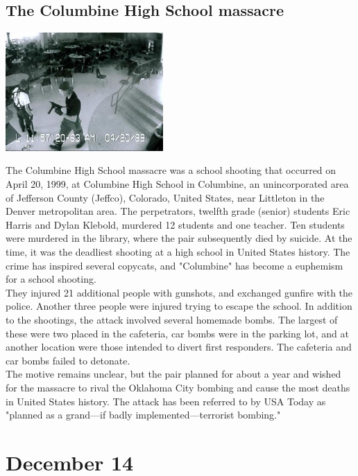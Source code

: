 \documentclass[11pt]{report}
\begin{document}
\subsection{The Columbine High School massacre}
\vspace{2mm}\begin{center}\includegraphics[width=6cm]{./img/columbineMassacre.jpg}\end{center}
The Columbine High School massacre was a school shooting that occurred on April 20, 1999, at Columbine High School in Columbine, an unincorporated area of Jefferson County (Jeffco), Colorado, United States, near Littleton in the Denver metropolitan area. The perpetrators, twelfth grade (senior) students Eric Harris and Dylan Klebold, murdered 12 students and one teacher. Ten students were murdered in the library, where the pair subsequently died by suicide. At the time, it was the deadliest shooting at a high school in United States history. The crime has inspired several copycats, and "Columbine" has become a euphemism for a school shooting.\\
\indent They injured 21 additional people with gunshots, and exchanged gunfire with the police. Another three people were injured trying to escape the school. In addition to the shootings, the attack involved several homemade bombs. The largest of these were two placed in the cafeteria, car bombs were in the parking lot, and at another location were those intended to divert first responders. The cafeteria and car bombs failed to detonate.\\
\indent The motive remains unclear, but the pair planned for about a year and wished for the massacre to rival the Oklahoma City bombing and cause the most deaths in United States history. The attack has been referred to by USA Today as "planned as a grand—if badly implemented—terrorist bombing."
\section{December 14}
\end{document}
